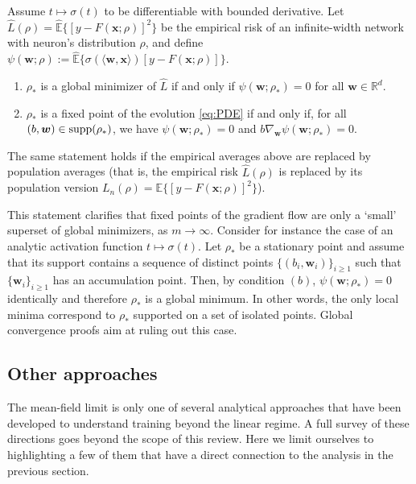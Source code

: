   \begin{lemma}
    Assume $t\mapsto \sigma(t)$ to be differentiable with bounded derivative. Let $\widehat{L}(\rho) = \widehat{{\mathbb E}}\{[y-F({\boldsymbol x};\rho)]^2\}$
    be the empirical risk of an infinite-width network with neuron's distribution $\rho$, and define $\psi({\boldsymbol w};\rho):= \widehat{{\mathbb E}}\{\sigma(\langle{\boldsymbol w},{\boldsymbol x}\rangle) [y-F({\boldsymbol x};\rho)]\}$.

    \begin{enumerate}
    \item[$(a)$] $\rho_*$ is a global minimizer of $\widehat{L}$ if and only if $\psi({\boldsymbol w};\rho_*)=0$ for all ${\boldsymbol w}\in{\mathbb R}^d$.
    \item[$(b)$] $\rho_*$ is a fixed point of the evolution \eqref{eq:PDE} if and only if, for all $(b,{\boldsymbol w})\in{\rm supp}(\rho_*)$,
      we have $\psi({\boldsymbol w};\rho_*)=0$ and $b\nabla_{{\boldsymbol w}}\psi({\boldsymbol w};\rho_*)=0$.
    \end{enumerate}

    The same statement holds if the empirical averages above are replaced by  population averages (that is, the empirical risk $\widehat{L}(\rho)$ is replaced by its population version ${L}_n(\rho) = \mathbb{E}\{ [y-F({\boldsymbol x};\rho)]^2\}$).
  \end{lemma}

  This statement clarifies that fixed points of the gradient flow are only a `small' superset of global minimizers, as $m\to\infty$. Consider for instance the case of an analytic activation function $t\mapsto\sigma(t)$.
 Let $\rho_*$ be a stationary point and assume that its support contains a sequence of distinct points $\{
 (b_i,{\boldsymbol w}_i)\}_{i\ge 1}$ such that 
 $\{{\boldsymbol w}_i\}_{i\ge 1}$ has an accumulation point. Then, by condition $(b)$, $\psi({\boldsymbol w};\rho_*) = 0$ identically and therefore $\rho_*$ is a global minimum. In other words, the only local minima correspond to $\rho_*$ supported on a set of isolated points. Global convergence proofs aim at ruling out this case.

 \subsection{Other approaches}

 The mean-field limit is only one of several analytical approaches that have been developed to understand training beyond the linear regime. A full survey of these directions goes beyond the scope of this review. Here we limit ourselves to highlighting a few of them that have a direct connection to the analysis in the previous section.

